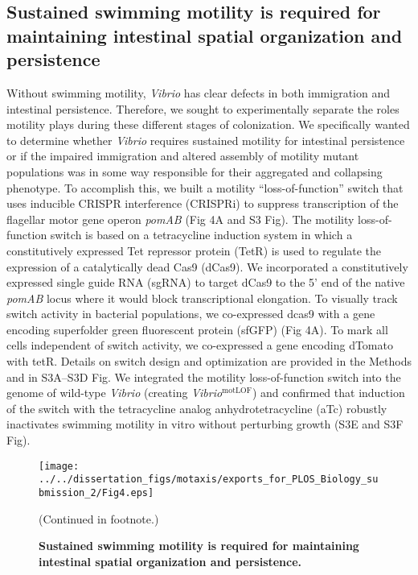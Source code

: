 {{{\subsection{Sustained swimming motility is required for maintaining intestinal spatial organization and persistence}  
Without swimming motility, \textit{Vibrio} has clear defects in both immigration and intestinal persistence. Therefore, we sought to experimentally separate the roles motility plays during these different stages of colonization. We specifically wanted to determine whether \textit{Vibrio} requires sustained motility for intestinal persistence or if the impaired immigration and altered assembly of motility mutant populations was in some way responsible for their aggregated and collapsing phenotype. To accomplish this, we built a motility ``loss-of-function'' switch that uses inducible CRISPR interference (CRISPRi) to suppress transcription of the flagellar motor gene operon \textit{pomAB} (Fig 4A and S3 Fig). The motility loss-of-function switch is based on a tetracycline induction system in which a constitutively expressed Tet repressor protein (TetR) is used to regulate the expression of a catalytically dead Cas9 (dCas9). We incorporated a constitutively expressed single guide RNA (sgRNA) to target dCas9 to the 5' end of the native \textit{pomAB} locus where it would block transcriptional elongation. To visually track switch activity in bacterial populations, we co-expressed dcas9 with a gene encoding superfolder green fluorescent protein (sfGFP) (Fig 4A). To mark all cells independent of switch activity, we co-expressed a gene encoding dTomato with tetR. Details on switch design and optimization are provided in the Methods and in S3A–S3D Fig. We integrated the motility loss-of-function switch into the genome of wild-type \textit{Vibrio} (creating \textit{Vibrio}$^{\text{motLOF}}$) and confirmed that induction of the switch with the tetracycline analog anhydrotetracycline (aTc) robustly inactivates swimming motility in vitro without perturbing growth (S3E and S3F Fig).  

\begin{figure}%
	\centerline{
		\texttt{[image: ../../dissertation\_figs/motaxis/exports\_for\_PLOS\_Biology\_submission\_2/Fig4.eps]}}
	\caption{\textbf{Sustained swimming motility is required for maintaining intestinal spatial organization and persistence.}}{(Continued in footnote.)}
	\label{fig:motaxis_fig4}
\end{figure}

}}}
